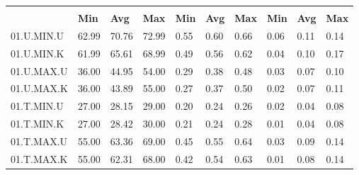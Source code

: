 \begin{tabular}{|>{\raggedright}p{}|>{\raggedright}p{}|>{\raggedright}p{}|>{\raggedright}p{}|>{\raggedright}p{}|>{\raggedright}p{}|>{\raggedright}p{}|>{\raggedright}p{}|>{\raggedright}p{}|>{\raggedright}p{}|}
\hline 
\multirow{2}{0.12\columnwidth}{\textbf{\footnotesize{}Bezeichnung}} & \multicolumn{3}{l|}{\textbf{\footnotesize{}CPU-Last {[}\%{]}}} & \multicolumn{3}{l|}{\textbf{\footnotesize{}Systemtime {[}s{]}}} & \multicolumn{3}{l|}{\textbf{\footnotesize{}Usertime {[}s{]}}}\tabularnewline
\cline{2-10} 
& \textbf{\footnotesize{}Min} & \textbf{\footnotesize{}Avg} & \textbf{\footnotesize{}Max} & \textbf{\footnotesize{}Min} & \textbf{\footnotesize{}Avg} & \textbf{\footnotesize{}Max} & \textbf{\footnotesize{}Min} & \textbf{\footnotesize{}Avg} & \textbf{\footnotesize{}Max}\tabularnewline
\hline 
\hline 
{\footnotesize{}01.U.MIN.U} & {\footnotesize{}62.99} & {\footnotesize{}70.76} & {\footnotesize{}72.99} & {\footnotesize{}0.55} & {\footnotesize{}0.60} & {\footnotesize{}0.66} & {\footnotesize{}0.06} & {\footnotesize{}0.11} & {\footnotesize{}0.14}\tabularnewline
\hline 
\hline 
{\footnotesize{}01.U.MIN.K} & {\footnotesize{}61.99} & {\footnotesize{}65.61} & {\footnotesize{}68.99} & {\footnotesize{}0.49} & {\footnotesize{}0.56} & {\footnotesize{}0.62} & {\footnotesize{}0.04} & {\footnotesize{}0.10} & {\footnotesize{}0.17}\tabularnewline
\hline 
\hline 
{\footnotesize{}01.U.MAX.U} & {\footnotesize{}36.00} & {\footnotesize{}44.95} & {\footnotesize{}54.00} & {\footnotesize{}0.29} & {\footnotesize{}0.38} & {\footnotesize{}0.48} & {\footnotesize{}0.03} & {\footnotesize{}0.07} & {\footnotesize{}0.10}\tabularnewline
\hline 
\hline 
{\footnotesize{}01.U.MAX.K} & {\footnotesize{}36.00} & {\footnotesize{}43.89} & {\footnotesize{}55.00} & {\footnotesize{}0.27} & {\footnotesize{}0.37} & {\footnotesize{}0.50} & {\footnotesize{}0.02} & {\footnotesize{}0.07} & {\footnotesize{}0.11}\tabularnewline
\hline 
\hline 
{\footnotesize{}01.T.MIN.U} & {\footnotesize{}27.00} & {\footnotesize{}28.15} & {\footnotesize{}29.00} & {\footnotesize{}0.20} & {\footnotesize{}0.24} & {\footnotesize{}0.26} & {\footnotesize{}0.02} & {\footnotesize{}0.04} & {\footnotesize{}0.08}\tabularnewline
\hline 
\hline 
{\footnotesize{}01.T.MIN.K} & {\footnotesize{}27.00} & {\footnotesize{}28.42} & {\footnotesize{}30.00} & {\footnotesize{}0.21} & {\footnotesize{}0.24} & {\footnotesize{}0.28} & {\footnotesize{}0.01} & {\footnotesize{}0.04} & {\footnotesize{}0.08}\tabularnewline
\hline 
\hline 
{\footnotesize{}01.T.MAX.U} & {\footnotesize{}55.00} & {\footnotesize{}63.36} & {\footnotesize{}69.00} & {\footnotesize{}0.45} & {\footnotesize{}0.55} & {\footnotesize{}0.64} & {\footnotesize{}0.03} & {\footnotesize{}0.09} & {\footnotesize{}0.14}\tabularnewline
\hline 
\hline 
{\footnotesize{}01.T.MAX.K} & {\footnotesize{}55.00} & {\footnotesize{}62.31} & {\footnotesize{}68.00} & {\footnotesize{}0.42} & {\footnotesize{}0.54} & {\footnotesize{}0.63} & {\footnotesize{}0.01} & {\footnotesize{}0.08} & {\footnotesize{}0.14}\tabularnewline
\hline 
\end{tabular}
\par
